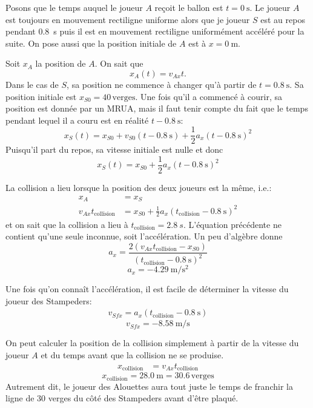 \documentclass{tufte-handout}
\begin{document}
Posons que le temps auquel le joueur $A$ reçoit le ballon est $t =
\SI{0}{\second}$.  Le joueur $A$ est toujours en mouvement rectiligne uniforme
alors que je joueur $S$ est au repos pendant \SI{0.8}{\second} puis il est en
mouvement rectiligne uniformément accéléré pour la suite.  On pose aussi que la
position initiale de $A$ est à $x = \SI{0}{\meter}$.

Soit $x_A$ la position de $A$. On sait que
\[
  x_A(t) = v_{Ax} t.
\]
Dans le cas de $S$, sa position ne commence à changer qu'à partir de $t =
\SI{0.8}{\second}$.  Sa position initiale est $x_{S0} = 40\, \mathrm{verges}$.
Une fois qu'il a commencé à courir, sa position est donnée par un MRUA, mais il
faut tenir compte du fait que le temps pendant lequel il a couru est en réalité
$t - \SI{0.8}{\second}$:
\[
  x_S(t) = x_{S0} + v_{S0} (t - \SI{0.8}{\second})
           + \frac{1}{2} a_x (t - \SI{0.8}{\second})^2
\]
Puisqu'il part du repos, sa vitesse initiale est nulle et donc
\[
  x_S(t) =  x_{S0} + \frac{1}{2} a_x (t - \SI{0.8}{\second})^2
\]

La collision a lieu lorsque la position des deux joueurs est la même, i.e.:
\begin{align*}
  x_A &= x_S \\
  v_{Ax} t_\mathrm{collision} &= x_{S0} + \frac{1}{2} a_x (t_\mathrm{collision} - \SI{0.8}{\second})^2
\end{align*}
et on sait que la collision a lieu à $t_\mathrm{collision} = \SI{2.8}{s}$.
L'équation précédente ne contient qu'une seule inconnue, soit l'accélération.
Un peu d'algèbre donne
\[
  a_x = \frac{2\left(v_{Ax} t_\mathrm{collision} - x_{S0}\right)}
             {(t_\mathrm{collision} - \SI{0.8}{\second})^2}
\]
\[
  \boxed{a_x = \SI{-4.29}{\meter\per\second\squared}}
\]

Une fois qu'on connaît l'accélération, il est facile de déterminer la vitesse
du joueur des Stampeders:
\begin{align*}
  v_{Sfx} = a_x (t_\mathrm{collision} - \SI{0.8}{\second})
\end{align*}
\[
  \boxed{v_{Sfx} = \SI{-8.58}{\meter\per\second}}
\]

On peut calculer la position de la collision simplement à partir de la vitesse
du joueur $A$ et du temps avant que la collision ne se produise.
\begin{align*}
  x_\mathrm{collision} &= v_{Ax} t_\mathrm{collision}
\end{align*}
\[
  \boxed{x_\mathrm{collision} = \SI{28.0}{\meter} = \num{30.6}\,\mathrm{verges}}
\]
Autrement dit, le joueur des Alouettes aura tout juste le temps de franchir la
ligne de \num{30} verges du côté des Stampeders avant d'être plaqué.
\end{document}

